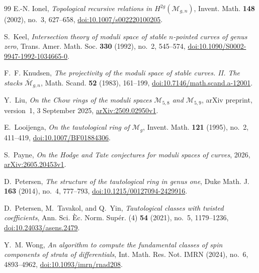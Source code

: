 \documentclass[12pt,reqno]{amsart}
\theoremstyle{definition}
\theoremstyle{remark}
\begin{document}
\begin{thebibliography}{99}
E.-N. Ionel,
\emph{Topological recursive relations in $H^{2g}(\mathcal M_{g,n})$},
Invent. Math. \textbf{148} (2002), no.~3, 627--658,
\href{https://doi.org/10.1007/s002220100205}
{doi:10.1007/s002220100205}.

S.~Keel,
\emph{Intersection theory of moduli space of stable $n$-pointed curves of
genus zero},
Trans. Amer. Math. Soc. \textbf{330} (1992), no.~2, 545--574,
\href{https://doi.org/10.1090/S0002-9947-1992-1034665-0}
{doi:10.1090/S0002-9947-1992-1034665-0}.

F.~F. Knudsen,
\emph{The projectivity of the moduli space of stable curves. II. The stacks
$\overline{\mathcal M}_{g,n}$},
Math. Scand. \textbf{52} (1983), 161--199,
\href{https://doi.org/10.7146/math.scand.a-12001}
{doi:10.7146/math.scand.a-12001}.

Y.~Liu,
\emph{On the Chow rings of the moduli spaces $\mathcal M_{5,8}$ and
$\mathcal M_{5,9}$},
arXiv preprint, version~1, 3 September 2025,
\href{https://arxiv.org/abs/2509.02950}{arXiv:2509.02950v1}.

E.~Looijenga,
\emph{On the tautological ring of $\mathcal M_g$},
Invent. Math. \textbf{121} (1995), no.~2, 411--419,
\href{https://doi.org/10.1007/BF01884306}
{doi:10.1007/BF01884306}.

S.~Payne,
\emph{On the Hodge and Tate conjectures for moduli spaces of curves},
2026,
\href{https://arxiv.org/abs/2605.20453}{arXiv:2605.20453v1}.

D.~Petersen,
\emph{The structure of the tautological ring in genus one},
Duke Math. J. \textbf{163} (2014), no.~4, 777--793,
\href{https://doi.org/10.1215/00127094-2429916}
{doi:10.1215/00127094-2429916}.

D.~Petersen, M.~Tavakol, and Q.~Yin,
\emph{Tautological classes with twisted coefficients},
Ann. Sci. \`Ec. Norm. Sup\'er. (4) \textbf{54} (2021), no.~5, 1179--1236,
\href{https://doi.org/10.24033/asens.2479}{doi:10.24033/asens.2479}.

Y.~M. Wong,
\emph{An algorithm to compute the fundamental classes of spin components
of strata of differentials},
Int. Math. Res. Not. IMRN (2024), no.~6, 4893--4962,
\href{https://doi.org/10.1093/imrn/rnad208}
{doi:10.1093/imrn/rnad208}.

\end{thebibliography}
\end{document}
